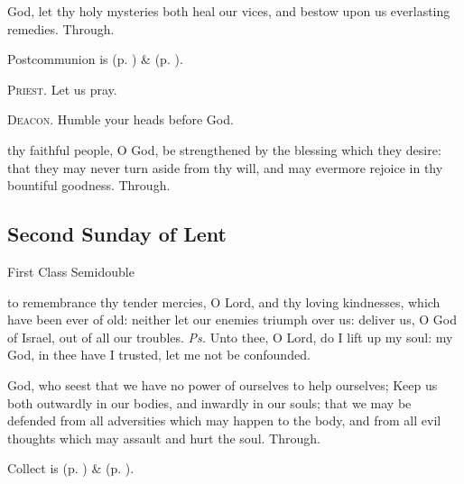 
\postcommunion
{} God, let thy holy mysteries both heal our vices, and bestow upon us everlasting remedies. Through.


\begin{rubric}
     Postcommunion is  (p. \pageref{SPSaints}) \&   (p. \pageref{SPLivingDeparted}).
\end{rubric}

\textsc{Priest.} Let us pray.\par
\textsc{Deacon.} Humble your heads before God.\par
{} thy faithful people, O God, be strengthened by the blessing which they desire: that they may never turn aside from thy will, and may evermore rejoice in thy bountiful goodness. Through.


\clearpage
\subsection{Second Sunday of Lent}
\begin{inhead}
{First Class Semidouble}
\end{inhead}
\fancyhead[RE,LO]{}


\introit
{} to remembrance thy tender mercies, O Lord, and thy loving kindnesses, which have been ever of old: neither let our enemies triumph over us: deliver us, O God of Israel, out of all our troubles. \textit{Ps.} Unto thee, O Lord, do I lift up my soul: my God, in thee have I trusted, let me not be confounded.

\collect
{} God, who seest that we have no power of ourselves to help ourselves; Keep us both outwardly in our bodies, and inwardly in our souls; that we may be defended from all adversities which may happen to the body, and from all evil thoughts which may assault and hurt the soul. Through.
\begin{rubric}
     Collect is  (p. \pageref{SPSaints}) \&   (p. \pageref{SPLivingDeparted}).
\end{rubric}

